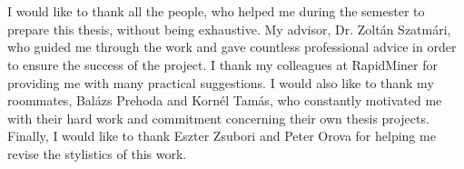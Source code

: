 \chapter*{\koszonetnyilvanitas}

I would like to thank all the people, who helped me during the semester to prepare this thesis, without being exhaustive. My advisor, Dr. Zoltán Szatmári, who guided me through the work and gave countless professional advice in order to ensure the success of the project. I thank my colleagues at RapidMiner for providing me with many practical suggestions. I would also like to thank my roommates, Balázs Prehoda and Kornél Tamás, who constantly motivated me with their hard work and commitment concerning their own thesis projects. Finally, I would like to thank Eszter Zsubori and Peter Orova for helping me revise the stylistics of this work.